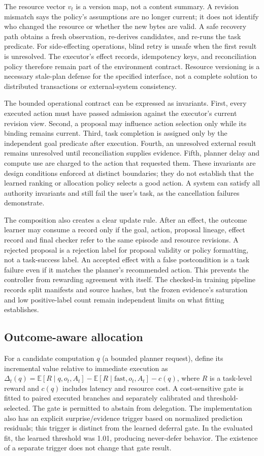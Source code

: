 \documentclass[11pt]{article}
\begin{document}
The resource vector $v_t$ is a version map, not a content summary. A revision mismatch says the policy's assumptions are no longer current; it does not identify who changed the resource or whether the new bytes are valid. A safe recovery path obtains a fresh observation, re-derives candidates, and re-runs the task predicate. For side-effecting operations, blind retry is unsafe when the first result is unresolved. The executor's effect records, idempotency keys, and reconciliation policy therefore remain part of the environment contract. Resource versioning is a necessary stale-plan defense for the specified interface, not a complete solution to distributed transactions or external-system consistency.

The bounded operational contract can be expressed as invariants. First, every executed action must have passed admission against the executor's current revision view. Second, a proposal may influence action selection only while its binding remains current. Third, task completion is assigned only by the independent goal predicate after execution. Fourth, an unresolved external result remains unresolved until reconciliation supplies evidence. Fifth, planner delay and compute use are charged to the action that requested them. These invariants are design conditions enforced at distinct boundaries; they do not establish that the learned ranking or allocation policy selects a good action. A system can satisfy all authority invariants and still fail the user's task, as the cancellation failures demonstrate.

The composition also creates a clear update rule. After an effect, the outcome learner may consume a record only if the goal, action, proposal lineage, effect record and final checker refer to the same episode and resource revisions. A rejected proposal is a rejection label for proposal validity or policy formatting, not a task-success label. An accepted effect with a false postcondition is a task failure even if it matches the planner's recommended action. This prevents the controller from rewarding agreement with itself. The checked-in training pipeline records split manifests and source hashes, but the frozen evidence's saturation and low positive-label count remain independent limits on what fitting establishes.

\subsection{Outcome-aware allocation}
For a candidate computation $q$ (a bounded planner request), define its incremental value relative to immediate execution as $\Delta_t(q)=\mathbb{E}[R\mid q,o_t,A_t]-\mathbb{E}[R\mid \text{fast},o_t,A_t]-c(q)$, where $R$ is a task-level reward and $c(q)$ includes latency and resource cost. A cost-sensitive gate is fitted to paired executed branches and separately calibrated and threshold-selected. The gate is permitted to abstain from delegation. The implementation also has an explicit surprise/evidence trigger based on normalized prediction residuals; this trigger is distinct from the learned deferral gate. In the evaluated fit, the learned threshold was 1.01, producing never-defer behavior. The existence of a separate trigger does not change that gate result.
\end{document}

